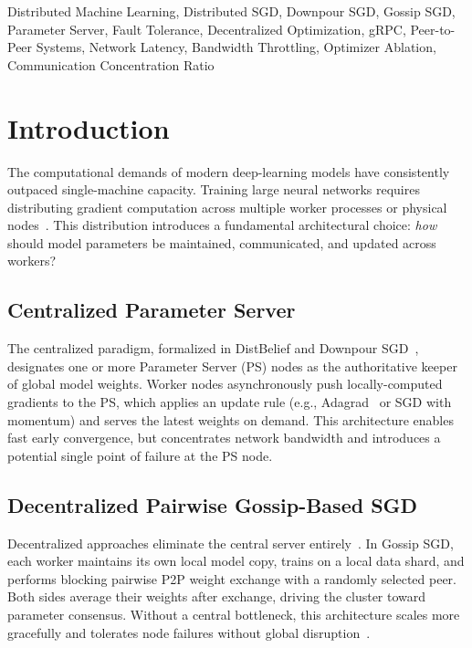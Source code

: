 \documentclass[conference]{IEEEtran}
\begin{document}
\begin{IEEEkeywords}
Distributed Machine Learning, Distributed SGD, Downpour SGD, Gossip SGD, Parameter Server, Fault Tolerance, Decentralized Optimization, gRPC, Peer-to-Peer Systems, Network Latency, Bandwidth Throttling, Optimizer Ablation, Communication Concentration Ratio
\end{IEEEkeywords}

\section{Introduction}

The computational demands of modern deep-learning models have consistently outpaced single-machine capacity. Training large neural networks requires distributing gradient computation across multiple worker processes or physical nodes~\cite{dean2012large}. This distribution introduces a fundamental architectural choice: \emph{how} should model parameters be maintained, communicated, and updated across workers?

\subsection{Centralized Parameter Server}
The centralized paradigm, formalized in DistBelief and Downpour SGD~\cite{dean2012large}, designates one or more Parameter Server (PS) nodes as the authoritative keeper of global model weights. Worker nodes asynchronously push locally-computed gradients to the PS, which applies an update rule (e.g., Adagrad~\cite{duchi2011adaptive} or SGD with momentum) and serves the latest weights on demand. This architecture enables fast early convergence, but concentrates network bandwidth and introduces a potential single point of failure at the PS node.

\subsection{Decentralized Pairwise Gossip-Based SGD}
Decentralized approaches eliminate the central server entirely~\cite{lian2017can}. In Gossip SGD, each worker maintains its own local model copy, trains on a local data shard, and performs blocking pairwise P2P weight exchange with a randomly selected peer. Both sides average their weights after exchange, driving the cluster toward parameter consensus. Without a central bottleneck, this architecture scales more gracefully and tolerates node failures without global disruption~\cite{blot2016gossip}.
\end{document}
